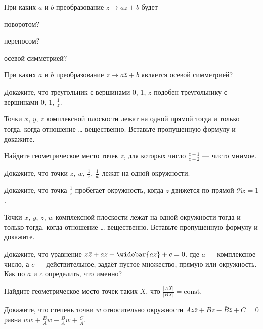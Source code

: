 \documentclass[a4paper, 12pt, num=23]{listok}
\begin{document}
\begin{problem}
	При каких $a$ и $b$ преобразование $z \mapsto az + b$ будет 
	\begin{probparts}
		\item поворотом?
		\item переносом?
		\item осевой симметрией?
	\end{probparts}
\end{problem}
\begin{problem}
	При каких $a$ и $b$ преобразование $z \mapsto a\bar z + b$ является осевой симметрией?
\end{problem}
\begin{problem}
	Докажите, что треугольник с вершинами $0$, $1$, $z$ подобен треугольнику с вершинами $0$, $1$, $\frac1z$.
\end{problem}
\begin{problem}
	Точки $x$, $y$, $z$ комплексной плоскости лежат на одной прямой тогда и только тогда, когда отношение \ldots{} вещественно. Вставьте пропущенную формулу и докажите.
\end{problem}
\begin{problem}
	Найдите геометрическое место точек $z$, для которых число $\frac{z-1}{z-2}$ --- чисто мнимое.
\end{problem}
\begin{problem}
	Докажите, что точки $z$, $w$, $\frac1z$, $\frac1w$ лежат на одной окружности.
\end{problem}
\begin{problem}
	Докажите, что точка $\frac1z$ пробегает окружность, когда $z$ движется по прямой $\Re z = 1$.
\end{problem}
\begin{problem}
	Точки $x$, $y$, $z$, $w$ комплексной плоскости лежат на одной окружности тогда и только тогда, когда отношение \ldots{} вещественно.
	Вставьте пропущенную формулу и докажите.
\end{problem}
\begin{problem}
	Докажите, что уравнение $z\bar z + az + \widebar{az} + c = 0$, где $a$ --- комплексное число,
	а $c$ --- действительное, задаёт пустое множество, прямую или окружность. Как по $a$ и $c$ определить, что именно?
\end{problem}
\begin{problem}
	Найдите геометрическое место точек таких $X$, что $\frac{|AX|}{|BX|} = \mathrm{const}$.
\end{problem}
\begin{problem}
	Докажите, что степень точки $w$ относительно окружности $Az\bar z + Bz - \bar B \bar z + C = 0$ равна
	$w\bar w + \frac B A w - \frac{\bar B}A w + \frac C A$.
\end{problem}
\end{document}
